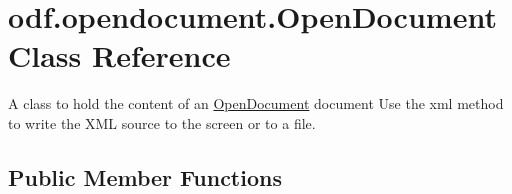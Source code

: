 \hypertarget{classodf_1_1opendocument_1_1OpenDocument}{\section{odf.\+opendocument.\+Open\+Document Class Reference}
\label{classodf_1_1opendocument_1_1OpenDocument}
}


A class to hold the content of an \hyperlink{classodf_1_1opendocument_1_1OpenDocument}{Open\+Document} document Use the xml method to write the X\+M\+L source to the screen or to a file.  


\subsection*{Public Member Functions}
